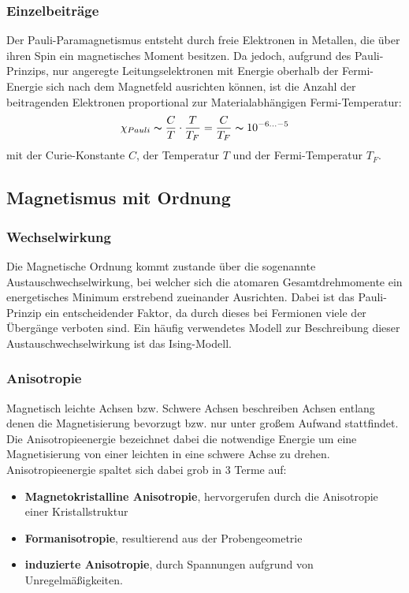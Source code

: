             \subsubsection*{Einzelbeiträge}
            Der Pauli-Paramagnetismus entsteht durch freie Elektronen in Metallen, die über ihren Spin
            ein magnetisches Moment besitzen. Da jedoch, aufgrund des Pauli-Prinzips, nur angeregte
            Leitungselektronen mit Energie oberhalb der Fermi-Energie sich nach dem Magnetfeld ausrichten können,
            ist die Anzahl der beitragenden Elektronen proportional zur Materialabhängigen Fermi-Temperatur:
            \begin{equation}
                \chi_{Pauli} \thicksim \frac{C}{T} \cdot \frac{T}{T_{F}} = \frac{C}{T_F}\thicksim 10^{-6 ... -5}
            \end{equation}
            mit der Curie-Konstante $C$, der Temperatur $T$ und der Fermi-Temperatur $T_F$.


    \subsection{Magnetismus mit Ordnung}
        \subsubsection*{Wechselwirkung}
            Die Magnetische Ordnung kommt zustande über die sogenannte Austauschwechselwirkung, bei welcher sich
            die atomaren Gesamtdrehmomente ein energetisches Minimum erstrebend zueinander Ausrichten. Dabei ist
            das Pauli-Prinzip ein entscheidender Faktor, da durch dieses bei Fermionen viele der Übergänge verboten sind.
            Ein häufig verwendetes Modell zur Beschreibung dieser Austauschwechselwirkung ist das Ising-Modell.
        \subsubsection*{Anisotropie}
            Magnetisch leichte Achsen bzw. Schwere Achsen beschreiben Achsen entlang denen die Magnetisierung bevorzugt
            bzw. nur unter großem Aufwand stattfindet. Die Anisotropieenergie bezeichnet dabei die notwendige Energie
            um eine Magnetisierung von einer leichten in eine schwere Achse zu drehen.\\
            Anisotropieenergie spaltet sich dabei grob in 3 Terme auf:
            \begin{itemize}
                \item \textbf{Magnetokristalline Anisotropie}, hervorgerufen durch die Anisotropie einer Kristallstruktur
                \item \textbf{Formanisotropie}, resultierend aus der Probengeometrie
                \item \textbf{induzierte Anisotropie}, durch Spannungen aufgrund von Unregelmäßigkeiten.
            \end{itemize}
